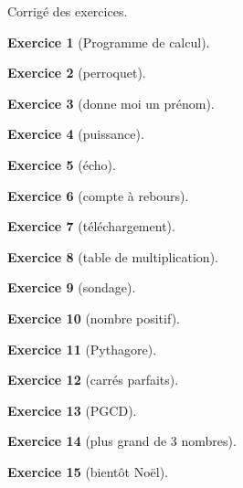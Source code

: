 \documentclass[12pt,oneside,french]{article}
\theoremstyle{definition}
\newtheorem{exo}{Exercice}
\begin{document}
\begin{center}\large Corrigé des exercices.\end{center}

\begin{exo}[Programme de calcul]~
    
\end{exo}

\begin{exo}[perroquet]~
    
\end{exo}

\begin{exo}[donne moi un prénom]~
    
\end{exo}

\begin{exo}[puissance]~
    
\end{exo}

\begin{exo}[écho]~
    
\end{exo}

\begin{exo}[compte à rebours]~
    
\end{exo}

\begin{exo}[téléchargement]~
    
\end{exo}

\newpage

\begin{exo}[table de multiplication]~
    
\end{exo}

\begin{exo}[sondage]~
    
\end{exo}

\begin{exo}[nombre positif]~
    
\end{exo}

\begin{exo}[Pythagore]~
    
\end{exo}

\begin{exo}[carrés parfaits]~
    
\end{exo}

\newpage

\begin{exo}[PGCD]~
    
\end{exo}

\begin{exo}[plus grand de 3 nombres]~
    
\end{exo}

\begin{exo}[bientôt Noël]~
    
\end{exo}
\end{document}
